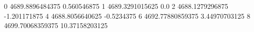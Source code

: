 0 4689.8896484375 0.560546875
1 4689.3291015625 0.0
2 4688.1279296875 -1.201171875
4 4688.8056640625 -0.5234375
6 4692.77880859375 3.44970703125
8 4699.70068359375 10.37158203125
